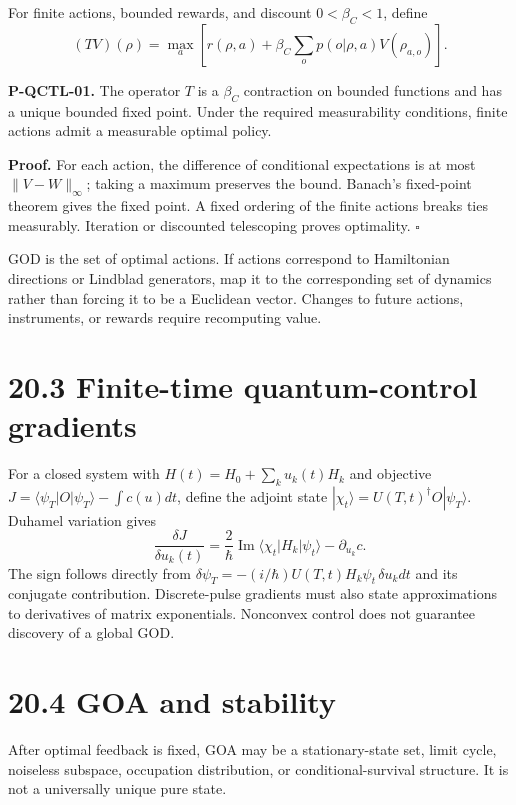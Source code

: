 \documentclass[
  11pt,
  oneside]{book}
\begin{document}
For finite actions, bounded rewards, and discount \(0<\beta_C<1\),
define \[
(TV)(\rho)=\max_a\left[r(\rho,a)+
\beta_C\sum_op(o|\rho,a)V(\rho_{a,o})\right].
\]

\label{p-qctl-01}{}

\textbf{P-QCTL-01.} The operator \(T\) is a \(\beta_C\) contraction on
bounded functions and has a unique bounded fixed point. Under the
required measurability conditions, finite actions admit a measurable
optimal policy.

\textbf{Proof.} For each action, the difference of conditional
expectations is at most \(\|V-W\|_\infty\); taking a maximum preserves
the bound. Banach's fixed-point theorem gives the fixed point. A fixed
ordering of the finite actions breaks ties measurably. Iteration or
discounted telescoping proves optimality. \(\square\)

GOD is the set of optimal actions. If actions correspond to Hamiltonian
directions or Lindblad generators, map it to the corresponding set of
dynamics rather than forcing it to be a Euclidean vector. Changes to
future actions, instruments, or rewards require recomputing value.

\section{20.3 Finite-time quantum-control gradients}

For a closed system with \(H(t)=H_0+\sum_k u_k(t)H_k\) and objective
\(J=\langle\psi_T|O|\psi_T\rangle-\int c(u)dt\), define the adjoint
state \(|\chi_t\rangle=U(T,t)^\dagger O|\psi_T\rangle\). Duhamel
variation gives \[
\frac{\delta J}{\delta u_k(t)}
=\frac2\hbar\operatorname{Im}\langle\chi_t|H_k|\psi_t\rangle
-\partial_{u_k}c.
\] The sign follows directly from
\(\delta\psi_T=-(i/\hbar)U(T,t)H_k\psi_t\,\delta u_kdt\) and its
conjugate contribution. Discrete-pulse gradients must also state
approximations to derivatives of matrix exponentials. Nonconvex control
does not guarantee discovery of a global GOD.

\section{20.4 GOA and stability}

After optimal feedback is fixed, GOA may be a stationary-state set,
limit cycle, noiseless subspace, occupation distribution, or
conditional-survival structure. It is not a universally unique pure
state.
\end{document}
